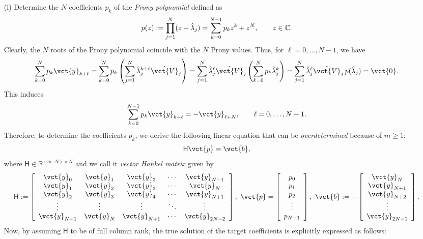 \documentclass[a4paper,10pt]{article}
\def\bbR{{\mathbb{R}}}
\def\bbC{{\mathbb{C}}}
\begin{document}
\begin{enumerate}
\item[(i)] Determine the $N$ coefficients $p_k$ of the \emph{Prony polynomial} defined as
\[
p(z):=\prod^{N}_{j=1}(z-\hat{\lambda}_j)=\sum^{N-1}_{k=0}p_kz^k+z^N,\makebox[2em]{}
z\in\bbC.
\]
Clearly, the $N$ roots of the Prony polynomial coincide with the $N$ Prony values.  
Thus, for $\ell=0,\ldots,N-1$, we have
\[
\sum^{N}_{k=0}p_k\vct{y}_{k+\ell}
=\sum^{N}_{k=0}p_k
\left(\sum^{N}_{j=1}\hat{\lambda}^{k+\ell}_j\hat{\vct{V}}_j\right)
=\sum^{N}_{j=1}\hat{\lambda}^\ell_j\hat{\vct{V}}_j
\left(\sum^{N}_{k=0}p_k\hat{\lambda}^k_j\right)
=\sum^{N}_{j=1}\hat{\lambda}^\ell_j\hat{\vct{V}}_j\,p(\hat{\lambda}_j)
=\vct{0}.
\]
This induces
\[
\sum^{N-1}_{k=0}p_k\vct{y}_{k+\ell}=-\vct{y}_{\ell+N},\makebox[2em]{}
\ell=0,\ldots,N-1.
\]
Therefore, to determine the coefficients $p_k$, we derive the following linear equation that can be \emph{overdetermined} because of $m\geq 1$:
\begin{equation}
\mathsf{H}\vct{p}=\vct{b},
\label{eqn:Hp=b}
\end{equation}
where $\mathsf{H}\in\bbR^{(m\cdot N)\times N}$ and we call it \emph{vector Hankel matrix} given by
\[
\mathsf{H}:=\left[
\begin{array}{ccccc}
\vct{y}_0 & \vct{y}_1 & \vct{y}_2 & \cdots & \vct{y}_{N-1}\\
\vct{y}_1 & \vct{y}_2 & \vct{y}_3 & \cdots & \vct{y}_{N}\\
\vct{y}_2 & \vct{y}_3 & \vct{y}_4 & \cdots & \vct{y}_{N+1}\\
\vdots & \vdots & \vdots & \ddots & \vdots\\
\vct{y}_{N-1} & \vct{y}_{N} & \vct{y}_{N+1} & \cdots & \vct{y}_{2N-2}
\end{array}
\right],~
\vct{p}=\left[\begin{array}{c}
p_0\\ p_1\\ p_2\\ \vdots\\ p_{N-1}
\end{array}\right],~
\vct{b}:=-\left[\begin{array}{c}
\vct{y}_N\\ \vct{y}_{N+1}\\ \vct{y}_{N+2} \\ \vdots\\ \vct{y}_{2N-1}
\end{array}\right].
\]
Now, by assuming $\mathsf{H}$ to be of full column rank, the true solution of the target coefficients is explicitly expressed as follows:

\end{enumerate}
\end{document}
